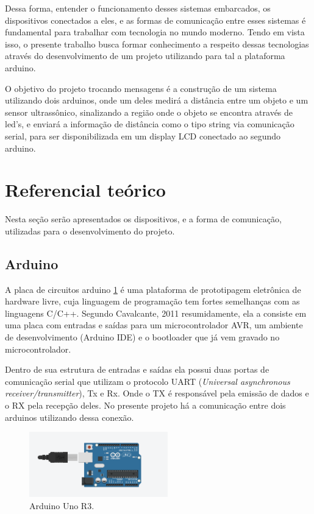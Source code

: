 \documentclass[conference]{IEEEtran}
\begin{document}
Dessa forma, entender o funcionamento desses sistemas embarcados, os dispositivos conectados a eles, e as formas de comunicação entre esses sistemas é fundamental para trabalhar com tecnologia no mundo moderno. 
Tendo em vista isso, o presente trabalho busca formar conhecimento a respeito dessas tecnologias através do desenvolvimento de um projeto  utilizando para tal a plataforma arduino.

O objetivo do projeto trocando mensagens é a construção de um sistema utilizando dois arduinos, onde um deles medirá a distância entre um objeto e um sensor ultrassônico, sinalizando a região onde o objeto se encontra através de led's, 
e enviará a informação de distância como o tipo string via comunicação serial, para ser disponibilizada em um display LCD conectado ao segundo arduino.

\section{Referencial teórico}
Nesta seção serão apresentados os dispositivos, e a forma de comunicação, utilizadas para o desenvolvimento do projeto.

\subsection{Arduino}
A placa de circuitos arduino \ref{fig:arduino} é uma plataforma de prototipagem eletrônica de hardware livre, cuja linguagem de programação tem fortes semelhanças com
as linguagens C/C++. Segundo Cavalcante, 2011 \cite{cavalcante2011} resumidamente, ela a consiste em uma placa com entradas e saídas para um microcontrolador AVR, um
ambiente de desenvolvimento (Arduino IDE) e o bootloader que já vem gravado no microcontrolador.

Dentro de sua estrutura de entradas e saídas ela possui duas portas de comunicação serial que utilizam o protocolo UART (\textit{Universal asynchronous receiver/transmitter}),
Tx e Rx. Onde o TX é responsável pela emissão de dados e o RX pela recepção deles. No presente projeto há a comunicação entre dois arduinos utilizando dessa conexão.

\begin{figure}[htbp]
    \centerline{
        \includegraphics[width=6cm]{images/arduino.png}
    }
    \caption{Arduino Uno R3.}
    \label{fig:arduino}
\end{figure}
\end{document}
